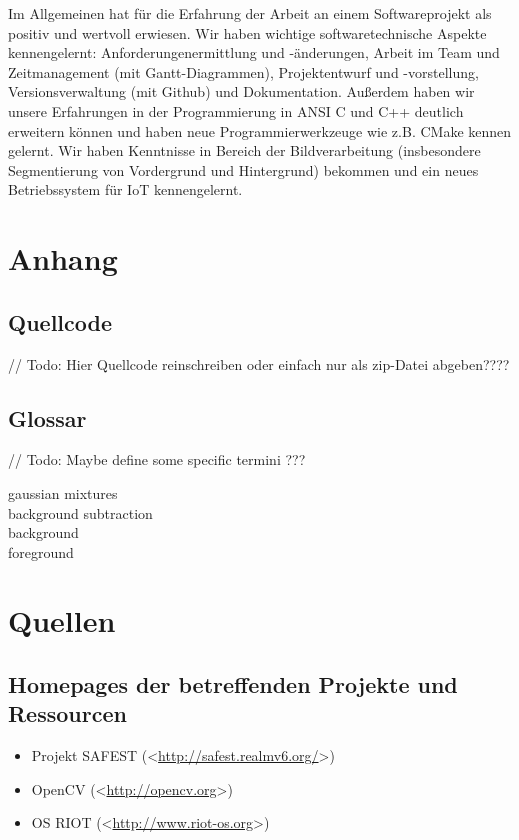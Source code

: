 \documentclass[10pt,a4paper]{article}
\begin{document}
Im Allgemeinen hat für die Erfahrung der Arbeit an einem Softwareprojekt als positiv und wertvoll erwiesen. Wir haben wichtige softwaretechnische Aspekte kennengelernt: Anforderungenermittlung und -änderungen, Arbeit im Team und Zeitmanagement (mit Gantt-Diagrammen), Projektentwurf und -vorstellung, Versionsverwaltung (mit Github) und Dokumentation. Außerdem haben wir unsere Erfahrungen in der Programmierung in ANSI C und C++ deutlich erweitern können und haben neue Programmierwerkzeuge wie z.B. CMake kennen gelernt. Wir haben Kenntnisse in Bereich der Bildverarbeitung (insbesondere Segmentierung von Vordergrund und Hintergrund) bekommen und ein neues Betriebssystem für IoT kennengelernt. \\

\newpage
\section{Anhang}

\subsection{Quellcode}

// Todo: Hier Quellcode reinschreiben oder einfach nur als zip-Datei abgeben????

\subsection{Glossar}

// Todo: Maybe define some specific termini ???

gaussian mixtures \\
background subtraction \\
background \\
foreground \\


\newpage
\section{Quellen}

\subsection*{Homepages der betreffenden Projekte und Ressourcen}
\begin{itemize}
\item Projekt SAFEST (\textless\href{http://safest.realmv6.org/}{http://safest.realmv6.org/}\textgreater)
\item OpenCV (\textless\href{http://opencv.org}{http://opencv.org}\textgreater)
\item OS RIOT (\textless\href{http://www.riot-os.org}{http://www.riot-os.org}\textgreater)
\end{itemize}
\end{document}
